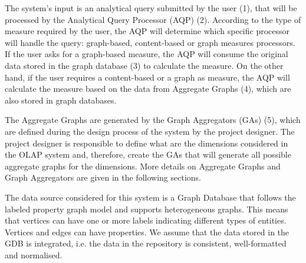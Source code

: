 The system's input is an analytical query submitted by the user (1), that will be processed by the Analytical Query Processor (AQP) (2). According to the type of measure required by the user, the AQP will determine which specific processor will handle the query: graph-based, content-based or graph measures processors. If the user asks for a graph-based measure, the AQP will consume the original data stored in the graph database (3) to calculate the measure. On the other hand, if the user requires a content-based or a graph as measure, the AQP will calculate the measure based on the data from Aggregate Graphs (4), which are also stored in graph databases.

The Aggregate Graphs are generated by the Graph Aggregators (GAs) (5), which are defined during the design process of the system by the project designer. The project designer is responsible to define what are the dimensions considered in the OLAP system and, therefore, create the GAs that will generate all possible aggregate graphs for the dimensions. More details on Aggregate Graphs and Graph Aggregators are given in the following sections.

The data source considered for this system is a Graph Database that follows the labeled property graph model and supports heterogeneous graphs. This means that vertices can have one or more labels indicating different types of entities. Vertices and edges can have properties. We assume that the data stored in the GDB is integrated, i.e. the data in the repository is consistent, well-formatted and normalised.

